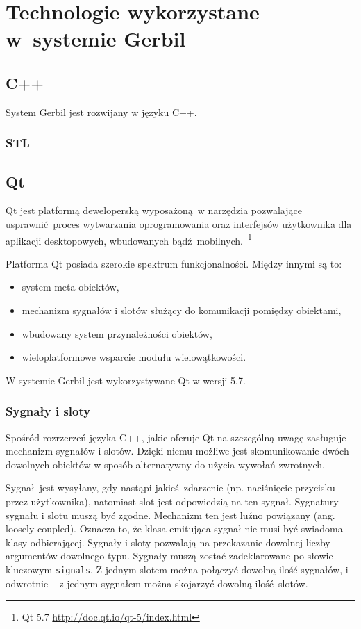 \chapter{Technologie wykorzystane w~systemie Gerbil}

 \section{C++}
System Gerbil jest rozwijany w języku C++. 

 \subsection{STL}

 \section{Qt}

Qt jest platformą deweloperską wyposażoną w narzędzia pozwalające usprawnić proces wytwarzania oprogramowania oraz interfejsów użytkownika dla aplikacji desktopowych, wbudowanych bądź mobilnych.~\footnote{Qt 5.7 \url{http://doc.qt.io/qt-5/index.html}} 

Platforma Qt posiada szerokie spektrum funkcjonalności. Między innymi są to:
\begin{itemize}
	\item system meta-obiektów,
	\item mechanizm sygnałów i slotów służący do komunikacji pomiędzy obiektami,
	\item wbudowany system przynależności obiektów,
	\item wieloplatformowe wsparcie modułu wielowątkowości.
		
\end{itemize}

W systemie Gerbil jest wykorzystywane Qt w wersji 5.7.

\subsection{Sygnały i sloty}

Spośród rozrzerzeń języka C++, jakie oferuje Qt na szczególną uwagę zasługuje mechanizm sygnałów i slotów. Dzięki niemu możliwe jest skomunikowanie dwóch dowolnych obiektów w sposób alternatywny do użycia wywołań zwrotnych. 

Sygnał jest wysyłany, gdy nastąpi jakieś zdarzenie (np. naciśnięcie przycisku przez użytkownika), natomiast slot jest odpowiedzią na ten sygnał. Sygnatury sygnału i slotu muszą być zgodne. Mechanizm ten jest luźno powiązany (ang. loosely coupled). Oznacza to, że klasa emitująca sygnał nie musi być swiadoma klasy odbierającej. Sygnały i sloty pozwalają na przekazanie dowolnej liczby argumentów dowolnego typu. Sygnały muszą zostać zadeklarowane po słowie kluczowym \lstinline$signals$. Z jednym slotem można połączyć dowolną ilość sygnałów, i odwrotnie -- z jednym sygnałem można skojarzyć dowolną ilość slotów.

